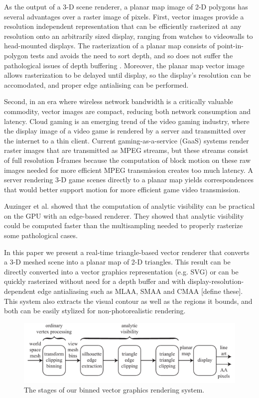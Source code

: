 \documentclass[review]{acmsiggraph}
\begin{document}
As the output of a 3-D scene renderer, a planar map image of 2-D polygons has
several advantages over a raster image of pixels. First, vector images provide
a resolution independent representation that can be efficiently rasterized at
any resolution onto an arbitrarily sized display, ranging from watches to
videowalls to head-mounted displays. The rasterization of a planar map consists
of point-in-polygon
tests and avoids the need to sort depth, and so does not suffer the
pathological issues of depth buffering \cite{wmap,etc}. Moreover, the planar
map vector image allows rasterization to be delayed until display, so the
display's resolution can be accomodated, and proper edge antialising can be
performed.

Second, in an era where wireless network bandwidth is a critically
valuable commodity, vector images are compact, reducing both network
consumption and latency. Cloud gaming is an emerging trend of the video gaming
industry, where the display image of a video game is rendered by a server and
transmitted over the internet to a thin client. Current gaming-as-a-service
(GaaS) systems render raster images that are transmitted as MPEG streams, but
these streams consist of full resolution I-frames because the computation of
block motion on these raw images needed for more efficient MPEG transmission
creates too much latency. A server rendering 3-D game scenes directly to a
planar map yields correspondences that would better support motion for more
efficient game video transmission.

Auzinger et al. \cite{auzinger2013} showed that the computation of analytic
visibility can be practical on the GPU with an edge-based renderer. They
showed that analytic visibility could be computed faster than the
multisampling needed to properly rasterize some pathological cases.

In this paper we present a real-time triangle-based vector renderer that
converts a 3-D meshed scene into a planar map of 2-D triangles. This result can
be directly converted into a vector graphics representation (e.g. SVG)
or can be quickly rasterized without need for a depth buffer and with
display-resolution-dependent edge antialiasing such as MLAA, SMAA and CMAA
[define these]. This system also extracts the
visual contour as well as the regions it bounds, and both can be easily
stylized for non-photorealistic rendering.

\begin{figure}
\includegraphics{images/pipeline.pdf}
\caption{The stages of our binned vector graphics rendering system.}
\label{fig:pipeline}
\end{figure}
\end{document}
